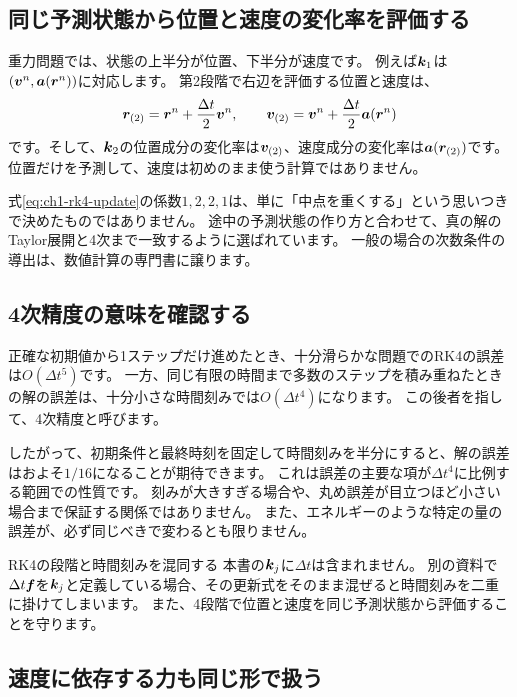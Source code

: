\subsection{同じ予測状態から位置と速度の変化率を評価する}

重力問題では、状態の上半分が位置、下半分が速度です。
例えば$\boldsymbol k_1$は$(\boldsymbol v^n,\boldsymbol a(\boldsymbol r^n))$に対応します。
第2段階で右辺を評価する位置と速度は、
\begin{equation}
\boldsymbol r_{(2)}=\boldsymbol r^n+\frac{\Delta t}{2}\boldsymbol v^n,\qquad
\boldsymbol v_{(2)}=\boldsymbol v^n+\frac{\Delta t}{2}\boldsymbol a(\boldsymbol r^n)
\label{eq:ch1-stage-two}
\end{equation}
です。そして、$\boldsymbol k_2$の位置成分の変化率は$\boldsymbol v_{(2)}$、速度成分の変化率は$\boldsymbol a(\boldsymbol r_{(2)})$です。
位置だけを予測して、速度は初めのまま使う計算ではありません。

式\eqref{eq:ch1-rk4-update}の係数$1,2,2,1$は、単に「中点を重くする」という思いつきで決めたものではありません。
途中の予測状態の作り方と合わせて、真の解のTaylor展開と4次まで一致するように選ばれています。
一般の場合の次数条件の導出は、数値計算の専門書に譲ります。\cite{sugiura2009}

\subsection{4次精度の意味を確認する}

正確な初期値から1ステップだけ進めたとき、十分滑らかな問題でのRK4の誤差は$O(\Delta t^5)$です。
一方、同じ有限の時間まで多数のステップを積み重ねたときの解の誤差は、十分小さな時間刻みでは$O(\Delta t^4)$になります。
この後者を指して、4次精度と呼びます。

したがって、初期条件と最終時刻を固定して時間刻みを半分にすると、解の誤差はおよそ$1/16$になることが期待できます。
これは誤差の主要な項が$\Delta t^4$に比例する範囲での性質です。
刻みが大きすぎる場合や、丸め誤差が目立つほど小さい場合まで保証する関係ではありません。
また、エネルギーのような特定の量の誤差が、必ず同じべきで変わるとも限りません。

\begin{failbox}{RK4の段階と時間刻みを混同する}
本書の$\boldsymbol k_j$に$\Delta t$は含まれません。
別の資料で$\Delta t\boldsymbol f$を$\boldsymbol k_j$と定義している場合、その更新式をそのまま混ぜると時間刻みを二重に掛けてしまいます。
また、4段階で位置と速度を同じ予測状態から評価することを守ります。
\end{failbox}

\subsection{速度に依存する力も同じ形で扱う}

